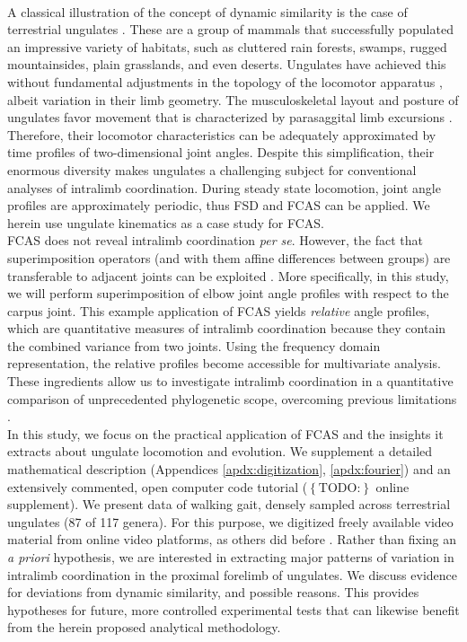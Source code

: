 \documentclass[10pt, a4paper]{article}
\newcommand{\todo}[1]{\colorbox{terracotta!30!yellow}{\footnotesize{$\left\lbrace\text{TODO:}\right\rbrace$ }#1\normalsize}}
\begin{document}
\\A classical illustration of the concept of dynamic similarity is the case of terrestrial ungulates \citep{Alexander1983}. 
These are a group of mammals that successfully populated an impressive variety of habitats, such as cluttered rain forests, swamps, rugged mountainsides, plain grasslands, and even deserts. 
Ungulates have achieved this without fundamental adjustments in the topology of the locomotor apparatus \citep{McMahon1975,Alexander1984}, albeit variation in their limb geometry. 
The musculoskeletal layout and posture of ungulates favor movement that is characterized by parasaggital limb excursions \citep[][]{Jenkins1971,Stein1997}. 
Therefore, their locomotor characteristics can be adequately approximated by time profiles of two-dimensional joint angles. 
Despite this simplification, their enormous diversity makes ungulates a challenging subject for conventional analyses of intralimb coordination. 
During steady state locomotion, joint angle profiles are approximately periodic, thus FSD and FCAS can be applied. 
We herein use ungulate kinematics as a case study for FCAS.
\\FCAS does not reveal intralimb coordination \textit{per se}. 
However, the fact that superimposition operators (and with them affine differences between groups) are transferable to adjacent joints can be exploited \citep[analogous to][]{Mielke2018}. 
More specifically, in this study, we will perform superimposition of elbow joint angle profiles with respect to the carpus joint. 
This example application of FCAS yields \textit{relative} angle profiles, which are quantitative measures of intralimb coordination because they contain the combined variance from two joints. 
Using the frequency domain representation, the relative profiles become accessible for multivariate analysis. 
These ingredients allow us to investigate intralimb coordination in a quantitative comparison of unprecedented phylogenetic scope, overcoming previous limitations \citep{Gatesy2011}. 
\\In this study, we focus on the practical application of FCAS and the insights it extracts about ungulate locomotion and evolution. 
We supplement a detailed mathematical description (Appendices \ref{apdx:digitization}, \ref{apdx:fourier}) and an extensively commented, open computer code tutorial (\todo{online supplement}). 
We present data of walking gait, densely sampled across terrestrial ungulates (87 of 117 genera). 
For this purpose, we digitized freely available video material from online video platforms, as others did before \citep{Biancardi2012,Lees2016}. 
Rather than fixing an \textit{a priori} hypothesis, we are interested in extracting major patterns of variation in intralimb coordination in the proximal forelimb of ungulates. 
We discuss evidence for deviations from dynamic similarity, and possible reasons. 
This provides hypotheses for future, more controlled experimental tests that can likewise benefit from the herein proposed analytical methodology. 
\end{document}
